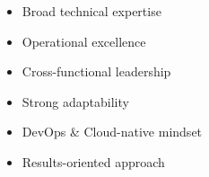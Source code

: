 %
%
%

\twocolumnsection
{
\begin{skills}
\end{skills}}
{
\vspace{1em}
\begin{itemize}
	\item Broad technical expertise
	\item Operational excellence                    
    \item Cross-functional leadership
    \item Strong adaptability
    \item DevOps \& Cloud-native mindset
    \item Results-oriented approach
\end{itemize}
}

